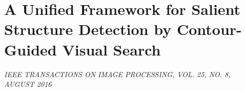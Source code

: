 \section{A Unified Framework for Salient Structure Detection by Contour-Guided Visual Search}

\begin{center}
    \author{
    Kai Fu Yang,
    Hui Li,
    Chao-Yi Li,
    and Young-Jie Li,
   \emph{Member}, 
    IEEE
}
\end{center}

\emph{IEEE TRANSACTIONS ON IMAGE PROCESSING, VOL. 25, NO. 8, AUGUST 2016}
